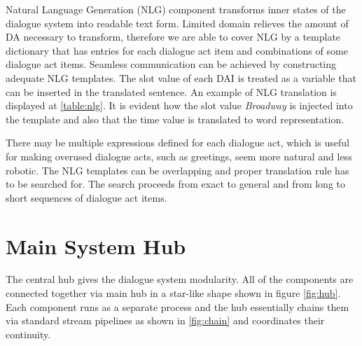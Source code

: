 Natural Language Generation (NLG) component transforms inner states of the dialogue system into readable text form.
Limited domain relieves the amount of DA necessary to transform, therefore we are able to cover NLG by a template dictionary that has entries for each dialogue act item and combinations of some dialogue act items.
Seamless communication can be achieved by constructing adequate NLG templates.
The slot value of each DAI is treated as a variable that can be inserted in the translated sentence.
An example of NLG translation is displayed at \ref{table:nlg}.
It is evident how the slot value \textit{Broadway} is injected into the template and also that the time value is translated to word representation.

\begin{table}[h]
\centering
\small
\hspace*{-3pt}
\caption[NLG conversion of DA to sentence]{Translation example of dialogue act to sentence by Natural Language Generation component}
\label{table:nlg}
\end{table}

There may be multiple expressions defined for each dialogue act, which is useful for making overused dialogue acts, such as greetings, seem more natural and less robotic.
The NLG templates can be overlapping and proper translation rule has to be searched for.
The search proceeds from exact to general and from long to short sequences of dialogue act items.

\section{Main System Hub}

The central hub gives the dialogue system modularity.
All of the components are connected together via main hub in a star-like shape shown in figure \ref{fig:hub}.
Each component runs as a separate process and the hub essentially chains them via standard stream pipelines as shown in \ref{fig:chain} and coordinates their continuity.


